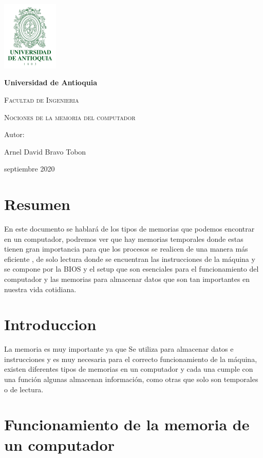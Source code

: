 \documentclass{article}
\begin{document}
\begin{titlepage}
{\includegraphics[width=0.2\textwidth]{udea.png}\par}
\vspace{1cm}
\centering
{\bfseries\LARGE Universidad de Antioquia \par}
\vspace{1cm}
{\scshape\Large Facultad de Ingenieria \par}
\vspace{3cm}
{\scshape\Huge Nociones de la memoria del computador \par}
\vspace{3cm}
\vfill
{\Large Autor: \par}
{\Large Arnel David Bravo Tobon  \par}
\vfill
{\Large septiembre 2020 \par}
\end{titlepage}

\section*{Resumen}
En este documento se hablará de los tipos de memorias que podemos encontrar en un computador, podremos ver que hay memorias temporales donde estas tienen gran importancia para que los procesos se realicen de una manera más eficiente , de solo lectura donde se encuentran las instrucciones de la máquina y se compone por la BIOS y el setup que son esenciales para el funcionamiento del computador y las memorias para almacenar datos que son tan importantes en nuestra vida cotidiana. 

\section*{Introduccion}
La memoria es muy importante ya que Se utiliza para almacenar datos e instrucciones y es muy necesaria para el correcto funcionamiento de la máquina, existen diferentes tipos de memorias en un computador y cada una cumple con una función algunas almacenan información, como otras que solo son temporales o de lectura.


\section*{Funcionamiento de la memoria de un computador}
\end{document}
